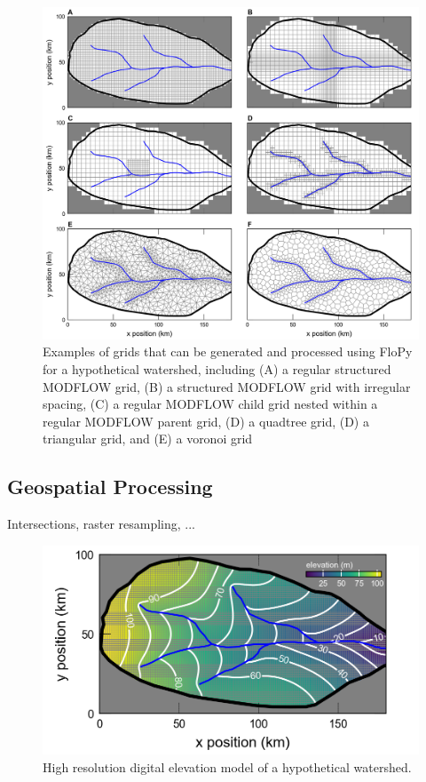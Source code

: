 \documentclass[11pt, oneside]{article}   	%
\begin{document}
\begin{figure}[ht!]
\begin{center}
\includegraphics{figures/grids.png}
\end{center}
\caption{Examples of grids that can be generated and processed using FloPy for a hypothetical watershed, including (A) a regular structured MODFLOW grid, (B) a structured MODFLOW grid with irregular spacing, (C) a regular MODFLOW child grid nested within a regular MODFLOW parent grid, (D) a quadtree grid, (D) a triangular grid, and (E) a voronoi grid}\label{fig:grids}
\end{figure}


\subsection{Geospatial Processing}

Intersections, raster resampling, ...

\begin{figure}[h]
	\begin{center}
		\includegraphics{figures/fine_topo.png}
	\end{center}
	\caption{High resolution digital elevation model of a hypothetical watershed.}
	\label{fig:dem}
\end{figure}
\end{document}

